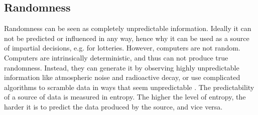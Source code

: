 \subsection{Randomness}
Randomness can be seen as completely unpredictable information. Ideally it can not be predicted or influenced in any way, hence why it can be used as a source of impartial decisions, e.g. for lotteries. 
However, computers are not random. Computers are intrinsically deterministic, and thus can not produce true randomness. Instead, they can generate it by observing highly unpredictable information like atmospheric noise and radioactive decay, or use complicated algorithms to scramble data in ways that seem unpredictable \cite{randomsources}. 
The predictability of a source of data is measured in entropy. The higher the level of entropy, the harder it is to predict the data produced by the source, and vice versa. 
